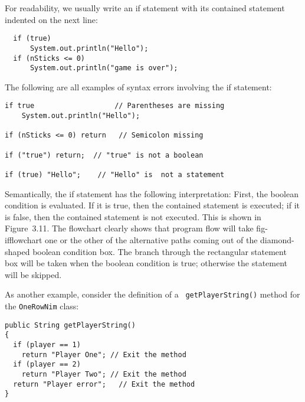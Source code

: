 \noindent For readability, we usually write an if statement with
its contained statement indented on the next line:

\begin{jjjlisting}
\begin{lstlisting}
  if (true)
      System.out.println("Hello");
  if (nSticks <= 0)
      System.out.println("game is over");
\end{lstlisting}
\end{jjjlisting}

\noindent The following are all examples of syntax errors involving
the if statement:

\begin{jjjlisting}
\begin{lstlisting}
if true                   // Parentheses are missing
    System.out.println("Hello");

if (nSticks <= 0) return   // Semicolon missing

if ("true") return;  // "true" is not a boolean

if (true) "Hello";    // "Hello" is  not a statement
\end{lstlisting}
\end{jjjlisting}

\noindent Semantically, the if statement has the following
interpretation: First, the boolean condition is evaluated.  If it is
true, then the contained statement is executed; if it is false, then
the contained statement is not executed.  This is shown in
Figure~3.11. The flowchart clearly shows that program flow will take
{fig-ifflowchart}
one or the other of the alternative paths coming out of the
diamond-shaped boolean condition box.  The branch through the
rectangular statement box will be taken when the boolean condition is
true; otherwise the statement will be skipped.

As another example, consider the definition of a {\tt
getPlayerString()} method for the {\tt OneRowNim} class:

\begin{jjjlisting}
\begin{lstlisting}
public String getPlayerString()
{
  if (player == 1)
    return "Player One"; // Exit the method
  if (player == 2)
    return "Player Two"; // Exit the method
  return "Player error";   // Exit the method
}
\end{lstlisting}
\end{jjjlisting}

